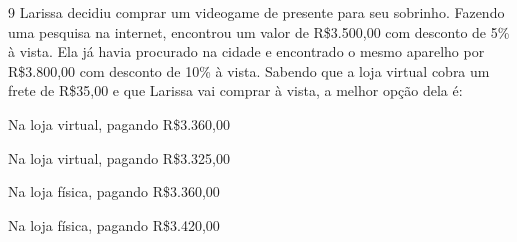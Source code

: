 

\num{9} Larissa decidiu comprar um videogame de presente para seu sobrinho.
Fazendo uma pesquisa na internet, encontrou um valor de R\$3.500,00 com
desconto de 5\% à vista. Ela já havia procurado na cidade e encontrado o
mesmo aparelho por R\$3.800,00 com desconto de 10\% à vista. Sabendo que
a loja virtual cobra um frete de R\$35,00 e que Larissa vai comprar à
vista, a melhor opção dela é:

\begin{escolha}
\item Na loja virtual, pagando R\$3.360,00
\item Na loja virtual, pagando R\$3.325,00
\item Na loja física, pagando R\$3.360,00 
\item Na loja física, pagando R\$3.420,00
\end{escolha}




